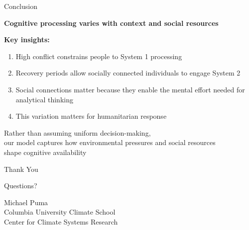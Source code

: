 \documentclass[aspectratio=169]{beamer}
\begin{document}
\begin{frame}{Conclusion}

\begin{center}
\Large
\textbf{Cognitive processing varies with context and social resources}
\end{center}

\vspace{1em}

\textbf{Key insights:}
\begin{enumerate}
    \item High conflict constrains people to System 1 processing
    \item Recovery periods allow socially connected individuals to engage System 2
    \item Social connections matter because they enable the mental effort needed for analytical thinking
    \item This variation matters for humanitarian response
\end{enumerate}

\vspace{1em}

\begin{center}
\large
Rather than assuming uniform decision-making,\\
our model captures how environmental pressures and social resources\\
shape cognitive availability
\end{center}

\end{frame}

\begin{frame}
\begin{center}
\Huge Thank You

\vspace{1em}

\Large Questions?

\vspace{1.5em}

\normalsize
Michael Puma\\
Columbia University Climate School\\
Center for Climate Systems Research
\end{center}
\end{frame}
\end{document}
